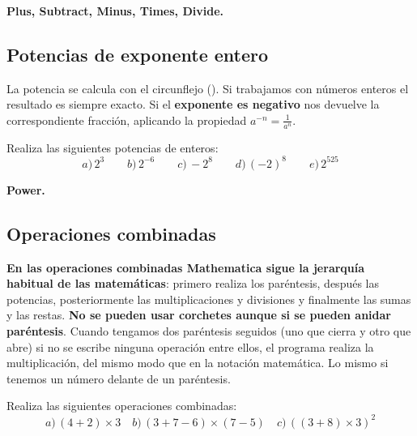 \documentclass[a4paper,10pt, draft]{article}
\newcommand{\com}[1]{\textbf{\color{blue}{#1}}}
\newenvironment{ejer}{\begin{tcolorbox}[center title, title=Ejercicios,
fonttitle=\sffamily\bfseries,colback=blue!5,colframe=orange]}{\end{tcolorbox}}
\newenvironment{funciones}{\begin{tcolorbox}[center title, title=Nuevas funciones, fonttitle=\sffamily\bfseries, colback=green!5!white,colframe=red!75!black]}{\end{tcolorbox}\bigskip}
\begin{document}
\begin{funciones}

 \textbf{Plus, Subtract, Minus, Times, Divide.}


\end{funciones}
\newpage


\subsection{Potencias de exponente entero}

La potencia se calcula con el circunflejo (\com{ \^{} }). Si trabajamos con números enteros el resultado es siempre exacto. Si el \textbf{exponente es negativo} nos devuelve la correspondiente fracción, aplicando la propiedad  $ a^{-n}=\displaystyle \frac{1}{a^n}$.

\begin{ejer}

Realiza las siguientes potencias de enteros:
 $$
  a)\,2^3 \qquad  b)\,2^{-6} \qquad c)\,-2^8 \qquad d)\, (-2)^8 \qquad  e)\,2^{525}
  $$
 
\end{ejer} 

\begin{funciones}

\textbf{Power.}


\end{funciones}


\newpage


\subsection{Operaciones combinadas}

\textbf{En las operaciones combinadas Mathematica sigue la jerarquía  habitual de las matemáticas}: primero realiza los paréntesis, después las potencias, posteriormente las multiplicaciones y divisiones y finalmente las sumas y las restas. \textbf{No se pueden usar corchetes aunque si se pueden anidar paréntesis}. Cuando tengamos dos paréntesis seguidos (uno que cierra y otro que abre) si no se escribe ninguna operación entre ellos, el programa realiza la multiplicación, del mismo modo que en la notación matemática. Lo mismo si tenemos un número delante de un paréntesis.



\begin{ejer}

Realiza las siguientes operaciones combinadas:
$$
a)\,(4+2) \times 3 \quad b)\,(3+7-6)\times (7-5) \quad c)\,((3+8)\times 3)^2
$$

\end{ejer}
\end{document}
